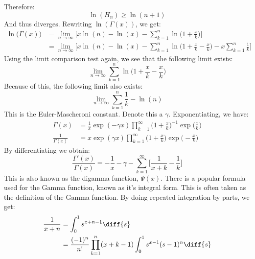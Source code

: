 \documentclass[crop=false,class=book,oneside]{standalone}
\begin{document}
        Therefore:
        \begin{equation}
            \ln(H_{n})\geq\ln(n+1)
        \end{equation}
        And thus diverges. Rewriting $\ln(\Gamma(x))$, we get:
        \begin{align}
            \ln\big(\Gamma(x)\big)
            &=\underset{n\rightarrow\infty}{\lim}\Big[
                x\ln(n)-\ln(x)-\sum_{k=1}^{n}\ln\big(1+\frac{x}{k}\big)\Big]\\
            &=\underset{n\rightarrow\infty}{\lim}\Big[
                x\ln(n)-\ln(x)-\sum_{k=1}^{n}\ln\big(1+\frac{x}{k}-\frac{x}{k}\big)
                -x\sum_{k=1}^{n}\frac{1}{k}\Big]\
        \end{align}
        Using the limit comparison test again, we see that the following limit exists:
        \begin{equation}
            \underset{n\rightarrow\infty}{\lim}
            \sum_{k=1}^{n}\ln\big(1+\frac{x}{k}-\frac{x}{k}\big)
        \end{equation}
        Because of this, the following limit also exists:
        \begin{equation}
            \underset{n\rightarrow\infty}{\lim}
            \sum_{k=1}^{n}\frac{1}{k}-\ln(n)
        \end{equation}
        This is the Euler-Mascheroni constant. Denote this a $\gamma$. Exponentiating,
        we have:
        \begin{align}
            \Gamma(x)&=\frac{1}{x}\exp(-\gamma{x})\prod_{k=1}^{\infty}
                \Big(1+\frac{x}{k}\Big)^{-1}\exp\Big(\frac{x}{k}\Big)\\
            \frac{1}{\Gamma(x)}
            &=x\exp(\gamma{x})\prod_{k=1}^{\infty}
                \Big(1+\frac{x}{k}\Big)\exp\Big(-\frac{x}{k}\Big)
        \end{align}
        By differentiating we obtain:
        \begin{equation}
            \frac{\Gamma'(x)}{\Gamma(x)}=
            \minus\frac{1}{x}-\gamma-\sum_{k=1}^{\infty}
                \Big[\frac{1}{x+k}-\frac{1}{k}\Big]
        \end{equation}
        This is also known as the digamma function, $\Psi(x)$. There is a popular
        formula used for the Gamma function, known as it's integral form. This is
        often taken as the definition of the Gamma function. By doing repeated integration
        by parts, we get:
        \begin{align}
            \frac{1}{x+n}
            &=\int_{0}^{1}s^{x+n-1}\diff{s}\\
            &=\frac{(-1)^{n}}{n!}\prod_{k=1}^{n}(x+k-1)
                \int_{0}^{1}s^{x-1}(s-1)^{n}\diff{s}
        \end{align}
\end{document}
